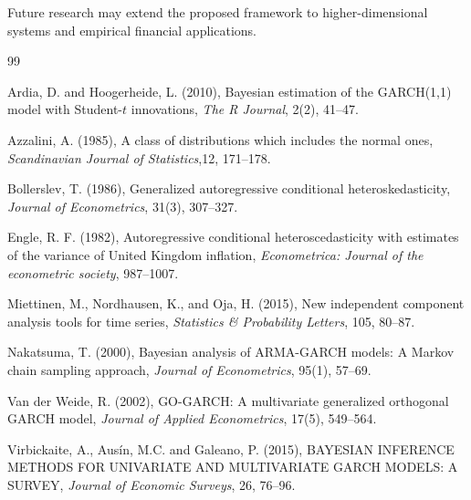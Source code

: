 \documentclass[twoside]{article}
\begin{document}
Future research may extend the proposed framework to higher-dimensional systems and empirical financial applications.
\begin{thebibliography}{99}

Ardia, D. and Hoogerheide, L. (2010),
Bayesian estimation of the GARCH(1,1) model with Student-$t$ innovations,
\textit{The R Journal}, 2(2), 41--47.

Azzalini, A. (1985),
A class of distributions which includes the normal ones,
\textit{Scandinavian Journal of Statistics},12, 171--178.

Bollerslev, T. (1986),
Generalized autoregressive conditional heteroskedasticity,
\textit{Journal of Econometrics},
31(3), 307--327.

Engle, R. F. (1982),
Autoregressive conditional heteroscedasticity with estimates of the variance of United Kingdom inflation,
\textit{Econometrica: Journal of the econometric society}, 987--1007.

Miettinen, M., Nordhausen, K., and Oja, H. (2015),
New independent component analysis tools for time series,
\textit{ Statistics \& Probability Letters},
105, 80--87.

Nakatsuma, T. (2000),
Bayesian analysis of ARMA-GARCH models: A Markov chain sampling approach,
\textit{Journal of Econometrics},
95(1), 57--69.

Van der Weide, R. (2002),
GO-GARCH: A multivariate generalized orthogonal GARCH model,
\textit{Journal of Applied Econometrics},
17(5), 549--564.


Virbickaite, A., Ausín, M.C. and Galeano, P. (2015),
BAYESIAN INFERENCE METHODS FOR UNIVARIATE AND MULTIVARIATE GARCH MODELS: A SURVEY,
\textit{Journal of Economic Surveys},
26, 76--96.

\end{thebibliography}

 
\end{document}
